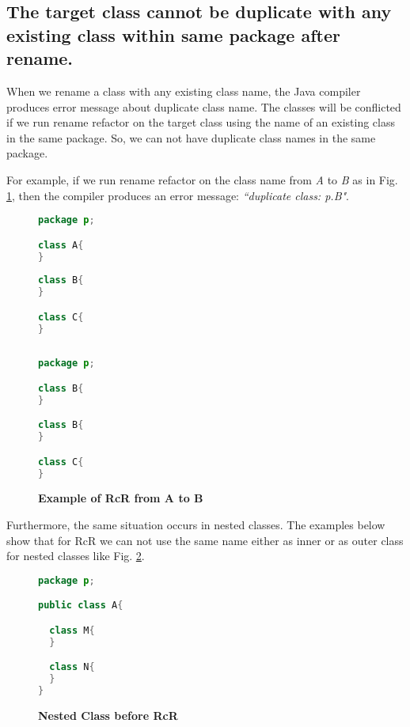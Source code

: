 \subsection{The target class cannot be duplicate with any existing class within same package after rename.}

When we rename a class with any existing class name, the Java compiler produces error message about duplicate class name. The classes will be conflicted if we run rename refactor on the target class using the name of an existing class in the same package. So, we can not have duplicate class names in the same package. 

For example, if we run rename refactor on the class name from \textsl{A} to \textsl{B} as in Fig. \ref{fig:afterrr}, then the compiler produces an error message: \textit{``duplicate class: p.B"}.

\begin{figure}[th]
\centering
\begin{minipage}[t]{0.45\linewidth}
\begin{lstlisting}[language=java, basicstyle=\scriptsize\ttfamily,frame=single]
package p;

class A{
}
	
class B{
}

class C{
}
 
\end{lstlisting}
\end{minipage}
\hfill
\begin{minipage}[t]{0.45\linewidth}
\begin{lstlisting}[language=java, basicstyle=\scriptsize\ttfamily,frame=single]
package p;

class B{
}	

class B{
}

class C{
}

\end{lstlisting}
\end{minipage}
\caption{\textbf{Example of RcR from A to B}}
\label{fig:afterrr}
\end{figure}


Furthermore, the same situation occurs in nested classes. The examples below show that for RcR we can not use the same name either as inner or as outer class for nested classes like Fig. \ref{fig:original}.

\begin{figure}[th]
\centering
\begin{minipage}[t]{0.5\linewidth}
\begin{lstlisting}[language=java, basicstyle=\scriptsize\ttfamily,frame=single]
package p;

public class A{	

  class M{
  }

  class N{
  }
} 
\end{lstlisting}
\end{minipage}
\caption{\textbf{Nested Class before RcR}}
\label{fig:original}
\end{figure}

